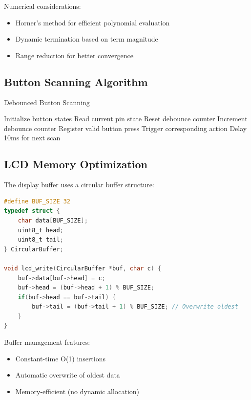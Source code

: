 \documentclass{article}
\begin{document}
Numerical considerations:
\begin{itemize}
\item Horner's method for efficient polynomial evaluation
\item Dynamic termination based on term magnitude
\item Range reduction for better convergence
\end{itemize}

\subsection{Button Scanning Algorithm}

\begin{algorithm}
\caption{Debounced Button Scanning}
\begin{algorithmic}[1]
\State Initialize button states
\Loop
        \State Read current pin state
            \State Reset debounce counter
        \Else
            \State Increment debounce counter
                \State Register valid button press
                \State Trigger corresponding action
            \EndIf
        \EndIf
    \EndFor
    \State Delay 10ms for next scan
\EndLoop
\end{algorithmic}
\end{algorithm}

\subsection{LCD Memory Optimization}

The display buffer uses a circular buffer structure:

\begin{lstlisting}[language=C]
#define BUF_SIZE 32
typedef struct {
    char data[BUF_SIZE];
    uint8_t head;
    uint8_t tail;
} CircularBuffer;

void lcd_write(CircularBuffer *buf, char c) {
    buf->data[buf->head] = c;
    buf->head = (buf->head + 1) % BUF_SIZE;
    if(buf->head == buf->tail) {
        buf->tail = (buf->tail + 1) % BUF_SIZE; // Overwrite oldest
    }
}
\end{lstlisting}

Buffer management features:
\begin{itemize}
\item Constant-time O(1) insertions
\item Automatic overwrite of oldest data
\item Memory-efficient (no dynamic allocation)
\end{itemize}
\end{document}
